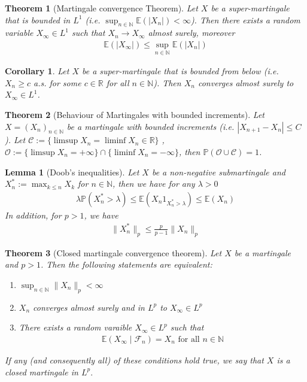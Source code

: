 \documentclass[11pt,a4paper, final]{article}
\newtheorem{lem}{Lemma}[section]
\newtheorem{thm}{Theorem}[section]
\newtheorem{cor}{Corollary}[section]
\theoremstyle{definition}
\begin{document}
\begin{thm}[Martingale convergence Theorem] Let $X$ be a super-martingale that is bounded in $L^1$ (i.e. $\sup_{n \in \mathbb{N}} \mathbb{E}(|X_n|) < \infty$). Then there exists a random variable $X_\infty \in L^1$ such that $X_n \to X_\infty$ almost surely, moreover 
\begin{align*}
\mathbb{E}(|X_\infty|) \leq \sup_{n \in \mathbb{N}} \mathbb{E}(|X_n|)
\end{align*}
\end{thm}
\begin{cor} Let $X$ be a super-martingale that is bounded from below (i.e. $X_n \geq c$ a.s. for some $c \in \mathbb{R}$ for all $n \in \mathbb{N}$). Then $X_n$ converges almost surely to $X_\infty \in L^1$. 
\end{cor}
\begin{thm}[Behaviour of Martingales with bounded increments] Let $X=(X_n)_{n \in \mathbb{N}}$ be a martingale with bounded increments (i.e. $|X_{n+1}-X_n| \leq C$). Let $\mathcal{C}:= \lbrace \limsup X_n = \liminf X_n \in \mathbb{R} \rbrace$ , $\mathcal{O}:= \lbrace \limsup X_n = + \infty \rbrace \cap \lbrace \liminf X_n = - \infty \rbrace $, then $\mathbb{P}( \mathcal{O} \cup \mathcal{C}) = 1$.  
\end{thm}
\begin{lem}[Doob's inequalities] Let $X$ be a non-negative submartingale and $X_n^*:= \max_{k \leq n} X_k$ for $n \in \mathbb{N}$, then we have for any $\lambda >0$
\begin{align*}
\lambda \mathbb{P}(X_n^* > \lambda)  \leq \mathbb{E}(X_n 1_{X_n^* > \lambda})  \leq \mathbb{E}(X_n) 
\end{align*}
In addition, for $p > 1$, we have
\begin{align*}
\|X_n^*\|_p \leq \frac{p}{p-1} \| X_n \|_p 
\end{align*}
\end{lem}
\begin{thm}[Closed martingale convergence theorem] Let $X$ be a martingale and $p>1$. Then the following statements are equivalent:
\begin{enumerate}
\item $\sup_{n \in \mathbb{N}} \|X_n\|_p < \infty$ 
\item $X_n$ converges almost surely and in $L^p$ to $X_\infty \in L^p$ 
\item There exists a random varaible $X_\infty \in L^p$ such that 
\begin{align*}
\mathbb{E}(X_\infty \mid \mathcal{F}_n) = X_n \text{ for all } n \in \mathbb{N}
\end{align*}
\end{enumerate}
If any (and consequently all) of these conditions hold true, we say that $X$ is a closed martingale in $L^p.$
\end{thm}
\end{document}
